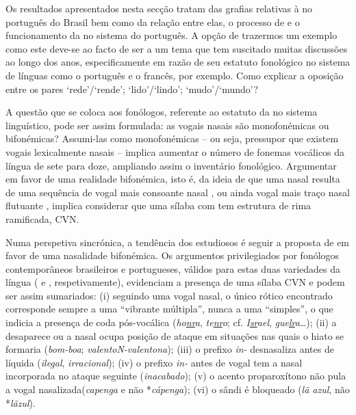\documentclass[output=paper]{LSP/langsci}
\begin{document}
Os resultados apresentados nesta secção tratam das grafias relativas à  no português do Brasil bem como da relação entre elas, o processo de  e o funcionamento da  no sistema do português. A opção de trazermos um exemplo como este deve-se ao facto de ser a  um tema que tem suscitado muitas discussões ao longo dos anos, especificamente em razão de seu estatuto fonológico no sistema de línguas como o português e o francês, por exemplo. Como explicar a oposição entre os pares `rede'/`rende'; `lido'/`lindo'; `mudo'/`mundo'?

A questão que se coloca aos fonólogos, referente ao estatuto da  no sistema linguístico, pode ser assim formulada: as vogais nasais são monofonémicas ou bifonémicas? Assumi-las como monofonémicas \citep{pontes1972} -- ou seja, pressupor que existem vogais lexicalmente nasais -- implica aumentar o número de fonemas vocálicos da língua de sete para doze, ampliando assim o inventário fonológico. Argumentar em favor de uma realidade bifonémica, isto é, da ideia de que uma nasal resulta de uma sequência de vogal mais consoante nasal \citep{camarajunior1970,bisol1999}, ou ainda vogal mais traço nasal flutuante \citep{mateusdandrade2000}, implica considerar que uma sílaba com  tem estrutura de rima ramificada, CVN. 

Numa perspetiva sincrónica, a tendência dos estudiosos é seguir a proposta de \citet{camarajunior1970} em favor de uma nasalidade bifonémica. Os argumentos privilegiados por fonólogos contemporâneos brasileiros e portugueses, válidos para estas duas variedades da língua (\citet{bisol1999} e \citet{mateusdandrade2000}, respetivamente), evidenciam a presença de uma sílaba CVN e podem ser assim sumariados: (i) seguindo uma vogal nasal, o único rótico encontrado corresponde sempre a uma ``vibrante múltipla'', nunca a uma ``simples'', o que indicia a presença de coda pós-vocálica (\textit{ho\underline{nr}a}, \textit{te\underline{nr}o}; cf. \textit{I\underline{sr}ael}, \textit{gue\underline{lr}a}\ldots); (ii) a  desaparece ou a nasal ocupa posição de ataque em situações nas quais o hiato se formaria (\textit{bom-boa}; \textit{valentoN-valentona}); (iii) o prefixo \textit{in-} desnasaliza antes de líquida (\textit{ilegal}, \textit{irracional}); (iv) o prefixo \textit{in-} antes de vogal tem a nasal incorporada no ataque seguinte (\textit{inacabado}); (v) o acento proparoxítono não pula a vogal nasalizada\largerpage (\textit{capenga} e não *\textit{cápenga}); (vi) o sândi é bloqueado (\textit{lã azul}, não *\textit{lãzul}).
\end{document}
